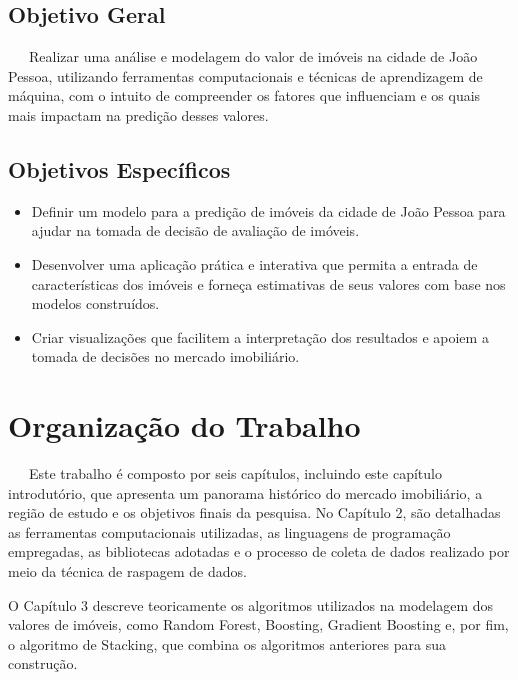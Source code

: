 \documentclass[
  12pt,
  a4paper,
]{scrreprt}
\begin{document}
\subsection{Objetivo Geral}\label{objetivo-geral}

~~~Realizar uma análise e modelagem do valor de imóveis na cidade de
João Pessoa, utilizando ferramentas computacionais e técnicas de
aprendizagem de máquina, com o intuito de compreender os fatores que
influenciam e os quais mais impactam na predição desses valores.

\subsection{Objetivos Específicos}\label{objetivos-especuxedficos}

\begin{itemize}
\item
  Definir um modelo para a predição de imóveis da cidade de João Pessoa
  para ajudar na tomada de decisão de avaliação de imóveis.
\item
  Desenvolver uma aplicação prática e interativa que permita a entrada
  de características dos imóveis e forneça estimativas de seus valores
  com base nos modelos construídos.
\item
  Criar visualizações que facilitem a interpretação dos resultados e
  apoiem a tomada de decisões no mercado imobiliário.
\end{itemize}

\section{Organização do Trabalho}\label{organizauxe7uxe3o-do-trabalho}

~~~Este trabalho é composto por seis capítulos, incluindo este capítulo
introdutório, que apresenta um panorama histórico do mercado
imobiliário, a região de estudo e os objetivos finais da pesquisa. No
Capítulo 2, são detalhadas as ferramentas computacionais utilizadas, as
linguagens de programação empregadas, as bibliotecas adotadas e o
processo de coleta de dados realizado por meio da técnica de raspagem de
dados.

\vspace{12pt}

O Capítulo 3 descreve teoricamente os algoritmos utilizados na modelagem
dos valores de imóveis, como Random Forest, Boosting, Gradient Boosting
e, por fim, o algoritmo de Stacking, que combina os algoritmos
anteriores para sua construção.
\end{document}
